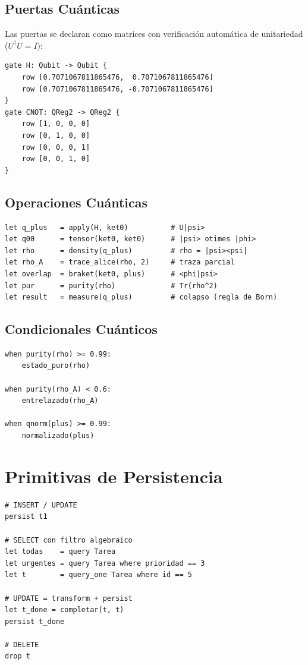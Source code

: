 \documentclass[12pt, a4paper, openany]{report}
\theoremstyle{definition}
\begin{document}
\subsection{Puertas Cuánticas}

Las puertas se declaran como matrices con verificación automática de unitariedad ($U^\dagger U = I$):

\begin{lstlisting}[caption={Declaración de puertas unitarias}]
gate H: Qubit -> Qubit {
    row [0.7071067811865476,  0.7071067811865476]
    row [0.7071067811865476, -0.7071067811865476]
}
gate CNOT: QReg2 -> QReg2 {
    row [1, 0, 0, 0]
    row [0, 1, 0, 0]
    row [0, 0, 0, 1]
    row [0, 0, 1, 0]
}
\end{lstlisting}

\subsection{Operaciones Cuánticas}

\begin{lstlisting}[caption={Operaciones nativas de LinLang/Q}]
let q_plus   = apply(H, ket0)          # U|psi>
let q00      = tensor(ket0, ket0)      # |psi> otimes |phi>
let rho      = density(q_plus)         # rho = |psi><psi|
let rho_A    = trace_alice(rho, 2)     # traza parcial
let overlap  = braket(ket0, plus)      # <phi|psi>
let pur      = purity(rho)             # Tr(rho^2)
let result   = measure(q_plus)         # colapso (regla de Born)
\end{lstlisting}

\subsection{Condicionales Cuánticos}

\begin{lstlisting}[caption={Condicionales sobre propiedades cuánticas}]
when purity(rho) >= 0.99:
    estado_puro(rho)

when purity(rho_A) < 0.6:
    entrelazado(rho_A)

when qnorm(plus) >= 0.99:
    normalizado(plus)
\end{lstlisting}

\section{Primitivas de Persistencia}

\begin{lstlisting}[caption={Persistencia nativa de primera clase}]
# INSERT / UPDATE
persist t1

# SELECT con filtro algebraico
let todas    = query Tarea
let urgentes = query Tarea where prioridad == 3
let t        = query_one Tarea where id == 5

# UPDATE = transform + persist
let t_done = completar(t, t)
persist t_done

# DELETE
drop t
\end{lstlisting}
\end{document}
